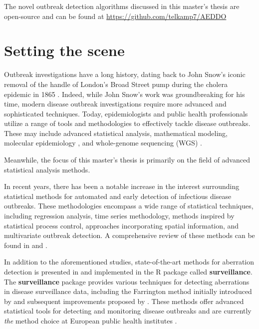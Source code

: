 \documentclass[a4paper,twoside,11pt]{report} %
\theoremstyle{definition}
\theoremstyle{definition}
\theoremstyle{definition}
\theoremstyle{definition}
\theoremstyle{remark}
\begin{document}
The novel outbreak detection algorithms discussed in this master's thesis are open-source and can be found at \href{https://github.com/telkamp7/AEDDO}{https://github.com/telkamp7/AEDDO}

\cleardoublepage

\chapter{Setting the scene}

Outbreak investigations have a long history, dating back to John Snow's iconic removal of the handle of London's Broad Street pump during the cholera epidemic in 1865 \autocite{Tulchinsky_2018}. Indeed, while John Snow's work was groundbreaking for his time, modern disease outbreak investigations require more advanced and sophisticated techniques. Today, epidemiologists and public health professionals utilize a range of tools and methodologies to effectively tackle disease outbreaks. These may include advanced statistical analysis, mathematical modeling, molecular epidemiology \autocite{Honardoost_2018,Struelens_2013}, and whole-genome sequencing (WGS) \autocite{Koeser_2012,Baldry_2010}.

Meanwhile, the focus of this master's thesis is primarily on the field of advanced statistical analysis methods.

In recent years, there has been a notable increase in the interest surrounding statistical methods for automated and early detection of infectious disease outbreaks. These methodologies encompass a wide range of statistical techniques, including regression analysis, time series methodology, methods inspired by statistical process control, approaches incorporating spatial information, and multivariate outbreak detection. A comprehensive review of these methods can be found in \textcite{Buckeridge_2007} and \textcite{Unkel_2012}.

In addition to the aforementioned studies, state-of-the-art methods for aberration detection is presented in \textcite{Salmon_2016} and implemented in the R package called \textbf{surveillance}. The \textbf{surveillance} package provides various techniques for detecting aberrations in disease surveillance data, including the Farrington method initially introduced by \textcite{Farrington_1996} and subsequent improvements proposed by \textcite{Noufaily_2013}. These methods offer advanced statistical tools for detecting and monitoring disease outbreaks and are currently \textit{the} method choice at European public health institutes \autocite{Hulth_2010}.
\end{document}
